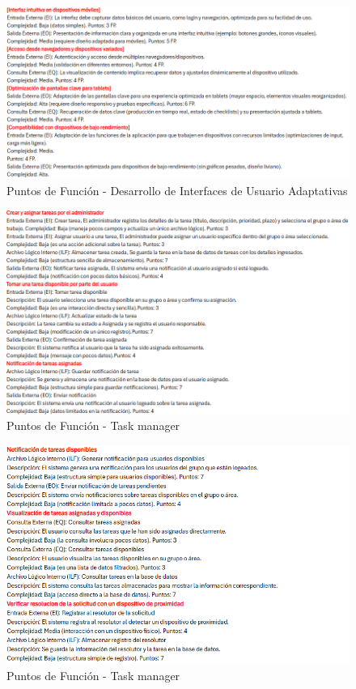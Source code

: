 \documentclass[12pt,letterpaper,spanish, xcolor=table]{report}
\numberwithin{figure}{subsection}
\begin{document}
	\begin{figure}[H]
		\centering
		\includegraphics[width=1.0\textwidth]
		{Imagenes/PathAyuda/FpsInterfacesUsuario.png}
		\caption{Puntos de Función - Desarrollo de Interfaces de Usuario Adaptativas 
		}\label{a2}
	\end{figure}
	
	\begin{figure}[H]
		\centering
		\includegraphics[width=1.0\textwidth]
		{Imagenes/PathAyuda/FpsTaskmanager.png}
		\caption{Puntos de Función - Task manager 
		}\label{a2}
	\end{figure}
	
	\begin{figure}[H]
		\centering
		\includegraphics[width=1.0\textwidth]
		{Imagenes/PathAyuda/FpsTaskmanager2.png}
		\caption{Puntos de Función - Task manager 
		}\label{a2}
	\end{figure}
	
\end{document}
